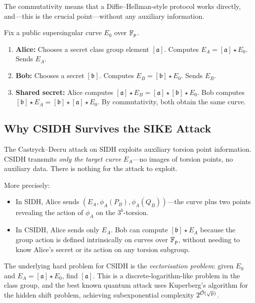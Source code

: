 The commutativity means that a Diffie--Hellman-style protocol works directly, and---this is the crucial point---without any auxiliary information.

\begin{definition}
\label{def:csidh}
Fix a public supersingular curve $E_0$ over $\mathbb{F}_p$.
\begin{enumerate}
\item \textbf{Alice:} Chooses a secret class group element $[\mathfrak{a}]$.  Computes $E_A = [\mathfrak{a}] \star E_0$.  Sends $E_A$.
\item \textbf{Bob:} Chooses a secret $[\mathfrak{b}]$.  Computes $E_B = [\mathfrak{b}] \star E_0$.  Sends $E_B$.
\item \textbf{Shared secret:} Alice computes $[\mathfrak{a}] \star E_B = [\mathfrak{a}] \star [\mathfrak{b}] \star E_0$.  Bob computes $[\mathfrak{b}] \star E_A = [\mathfrak{b}] \star [\mathfrak{a}] \star E_0$.  By commutativity, both obtain the same curve.
\end{enumerate}
\end{definition}

\subsection{Why CSIDH Survives the SIKE Attack}
\label{subsec:csidh-survives}

The Castryck--Decru attack on SIDH exploits auxiliary torsion point information.  CSIDH transmits \emph{only the target curve} $E_A$---no images of torsion points, no auxiliary data.  There is nothing for the attack to exploit.

More precisely:
\begin{itemize}
\item In SIDH, Alice sends $(E_A, \phi_A(P_B), \phi_A(Q_B))$---the curve plus two points revealing the action of $\phi_A$ on the $3^b$-torsion.
\item In CSIDH, Alice sends only $E_A$.  Bob can compute $[\mathfrak{b}] \star E_A$ because the group action is defined intrinsically on curves over $\mathbb{F}_p$, without needing to know Alice's secret or its action on any torsion subgroup.
\end{itemize}

The underlying hard problem for CSIDH is the \emph{vectorisation problem}: given $E_0$ and $E_A = [\mathfrak{a}] \star E_0$, find $[\mathfrak{a}]$.  This is a discrete-logarithm-like problem in the class group, and the best known quantum attack uses Kuperberg's algorithm for the hidden shift problem, achieving subexponential complexity $2^{\tilde{\mathcal{O}}(\sqrt{p})}$.

